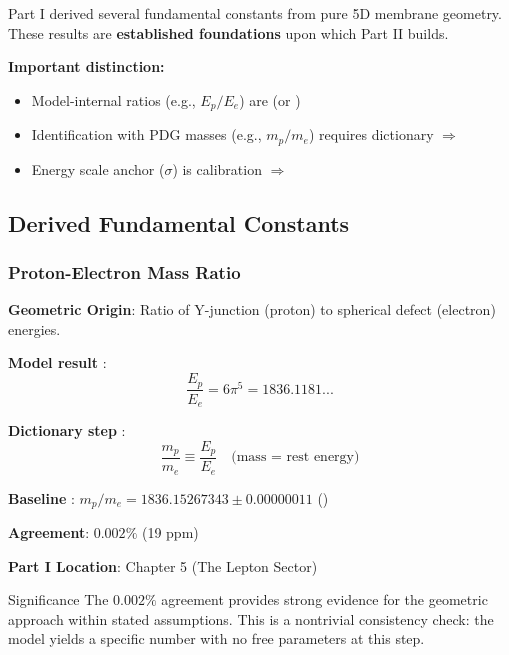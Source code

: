 Part I derived several fundamental constants from pure 5D membrane geometry.
These results are \textbf{established foundations} upon which Part II builds.

\textbf{Important distinction:}
\begin{itemize}[nosep]
\item Model-internal ratios (e.g., $E_p/E_e$) are \tagDer{} (or \tagDerSym{})
\item Identification with PDG masses (e.g., $m_p/m_e$) requires dictionary $\Rightarrow$ \tagDc{}
\item Energy scale anchor ($\sigma$) is calibration $\Rightarrow$ \tagCal{}
\end{itemize}

\subsection{Derived Fundamental Constants}

\subsubsection{Proton-Electron Mass Ratio}

\textbf{Geometric Origin}: Ratio of Y-junction (proton) to spherical defect (electron) energies.

\textbf{Model result} \tagDerSym{}:
\begin{equation}
\frac{E_p}{E_e} = 6\pi^5 = 1836.1181...
\label{eq:EpEe_bridge}
\end{equation}

\textbf{Dictionary step} \tagDc{}:
\begin{equation}
\frac{m_p}{m_e} \equiv \frac{E_p}{E_e} \quad\text{(mass = rest energy)}
\label{eq:mpme_bridge}
\end{equation}

\textbf{Baseline} \tagBL{}: $m_p/m_e = 1836.15267343 \pm 0.00000011$ ()

\textbf{Agreement}: $0.002\%$ (19 ppm)

\textbf{Part I Location}: Chapter 5 (The Lepton Sector)

\begin{statusbox}{Significance}
The $0.002\%$ agreement provides strong evidence for the geometric approach
within stated assumptions. This is a nontrivial consistency check:
the model yields a specific number with no free parameters at this step.
\end{statusbox}

